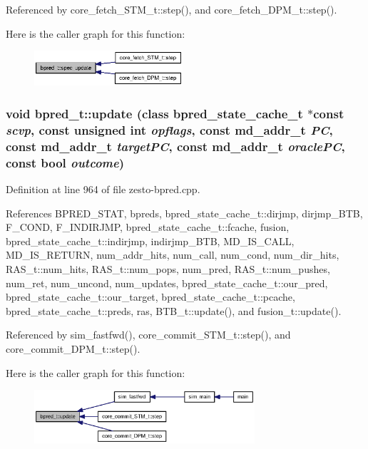 Referenced by core\_\-fetch\_\-STM\_\-t::step(), and core\_\-fetch\_\-DPM\_\-t::step().

Here is the caller graph for this function:\nopagebreak
\begin{figure}[H]
\begin{center}
\leavevmode
\includegraphics[width=156pt]{classbpred__t_90e48993937d7ed40623003e6d76b138_icgraph}
\end{center}
\end{figure}
\subsubsection[{update}]{\setlength{\rightskip}{0pt plus 5cm}void bpred\_\-t::update (class {\bf bpred\_\-state\_\-cache\_\-t} $\ast$const  {\em scvp}, \/  const unsigned int {\em opflags}, \/  const {\bf md\_\-addr\_\-t} {\em PC}, \/  const {\bf md\_\-addr\_\-t} {\em targetPC}, \/  const {\bf md\_\-addr\_\-t} {\em oraclePC}, \/  const bool {\em outcome})}\label{classbpred__t_8c7073a32e9c65c31b1af33b6c16b754}




Definition at line 964 of file zesto-bpred.cpp.

References BPRED\_\-STAT, bpreds, bpred\_\-state\_\-cache\_\-t::dirjmp, dirjmp\_\-BTB, F\_\-COND, F\_\-INDIRJMP, bpred\_\-state\_\-cache\_\-t::fcache, fusion, bpred\_\-state\_\-cache\_\-t::indirjmp, indirjmp\_\-BTB, MD\_\-IS\_\-CALL, MD\_\-IS\_\-RETURN, num\_\-addr\_\-hits, num\_\-call, num\_\-cond, num\_\-dir\_\-hits, RAS\_\-t::num\_\-hits, RAS\_\-t::num\_\-pops, num\_\-pred, RAS\_\-t::num\_\-pushes, num\_\-ret, num\_\-uncond, num\_\-updates, bpred\_\-state\_\-cache\_\-t::our\_\-pred, bpred\_\-state\_\-cache\_\-t::our\_\-target, bpred\_\-state\_\-cache\_\-t::pcache, bpred\_\-state\_\-cache\_\-t::preds, ras, BTB\_\-t::update(), and fusion\_\-t::update().

Referenced by sim\_\-fastfwd(), core\_\-commit\_\-STM\_\-t::step(), and core\_\-commit\_\-DPM\_\-t::step().

Here is the caller graph for this function:\nopagebreak
\begin{figure}[H]
\begin{center}
\leavevmode
\includegraphics[width=232pt]{classbpred__t_8c7073a32e9c65c31b1af33b6c16b754_icgraph}
\end{center}
\end{figure}



